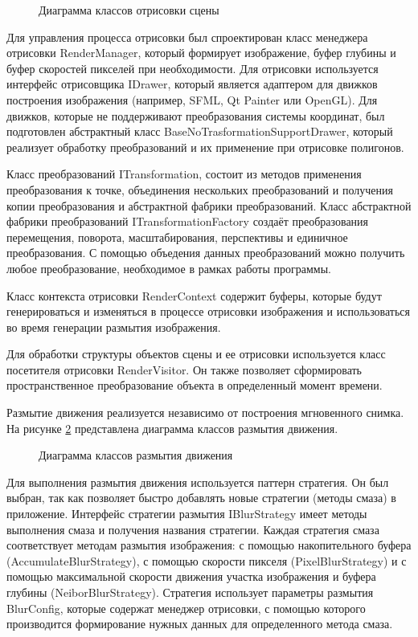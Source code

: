 \begin{figure}[h]
    \centering
    
    \caption{Диаграмма классов отрисовки сцены}
    \label{fig:uml_render}
\end{figure}

Для управления процесса отрисовки был спроектирован класс менеджера отрисовки RenderManager, который формирует изображение, буфер глубины и буфер  скоростей пикселей при необходимости. Для отрисовки используется интерфейс отрисовщика IDrawer, который является адаптером для движков построения изображения (например, SFML, Qt Painter или OpenGL). Для движков, которые не поддерживают преобразования системы координат, был подготовлен абстрактный класс BaseNoTrasformationSupportDrawer, который реализует обработку преобразований и их применение при отрисовке полигонов.  

Класс преобразований ITransformation, состоит из методов применения преобразования к точке, объединения нескольких преобразований и получения копии преобразования и абстрактной фабрики преобразований.
Класс абстрактной фабрики преобразований ITransformationFactory создаёт преобразования перемещения, поворота, масштабирования, перспективы и единичное преобразования. С помощью объедения данных преобразований можно получить любое преобразование, необходимое в рамках работы программы.

Класс контекста отрисовки RenderContext содержит буферы, которые будут генерироваться и изменяться в процессе отрисовки изображения и использоваться во время генерации размытия изображения.

Для обработки структуры объектов сцены и ее отрисовки используется класс посетителя отрисовки RenderVisitor. Он также позволяет сформировать пространственное преобразование объекта в определенный момент времени.

Размытие движения реализуется независимо от построения мгновенного снимка. На рисунке \ref{fig:uml_render} представлена диаграмма классов размытия движения.  

\begin{figure}[h]
    \centering
    
    \caption{Диаграмма классов размытия движения}
    \label{fig:uml_render}
\end{figure}

Для выполнения размытия движения используется паттерн стратегия. Он был выбран, так как позволяет быстро добавлять новые стратегии (методы смаза) в приложение. Интерфейс стратегии размытия IBlurStrategy имеет методы выполнения смаза и получения названия стратегии. Каждая стратегия смаза соответствует методам размытия изображения: с помощью накопительного буфера (AccumulateBlurStrategy), с помощью скорости пикселя (PixelBlurStrategy) и с помощью максимальной скорости
движения участка изображения и буфера глубины (NeiborBlurStrategy). Стратегия использует параметры размытия BlurConfig, которые содержат менеджер отрисовки, с помощью которого производится формирование нужных данных для определенного метода смаза.

